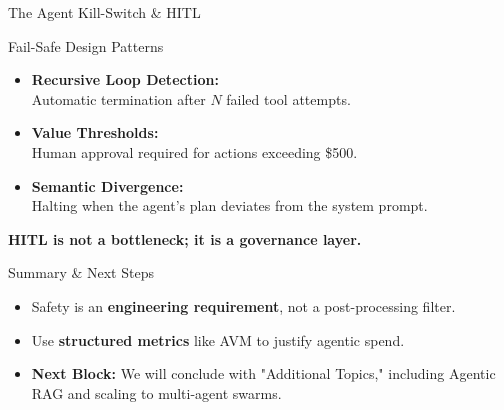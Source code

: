 \documentclass{beamer}       %
\begin{document}
\begin{frame}{The Agent Kill-Switch \& HITL}
    \small
    \begin{block}{Fail-Safe Design Patterns}
        \begin{itemize}
            \item \textbf{Recursive Loop Detection:}\\
                  Automatic termination after $N$ failed tool attempts.
            \item \textbf{Value Thresholds:}\\
                  Human approval required for actions exceeding \$500.
            \item \textbf{Semantic Divergence:}\\
                  Halting when the agent's plan deviates from the system prompt.
        \end{itemize}
    \end{block}
    \vfill
    \centering
    \textbf{HITL is not a bottleneck; it is a governance layer.}
\end{frame}

\begin{frame}{Summary \& Next Steps}
    \begin{itemize}
        \item Safety is an \textbf{engineering requirement}, not a post-processing filter.
        \item Use \textbf{structured metrics} like AVM to justify agentic spend.
        \item \textbf{Next Block:} We will conclude with "Additional Topics," including Agentic RAG and scaling to multi-agent swarms.
    \end{itemize}
\end{frame}
\end{document}
